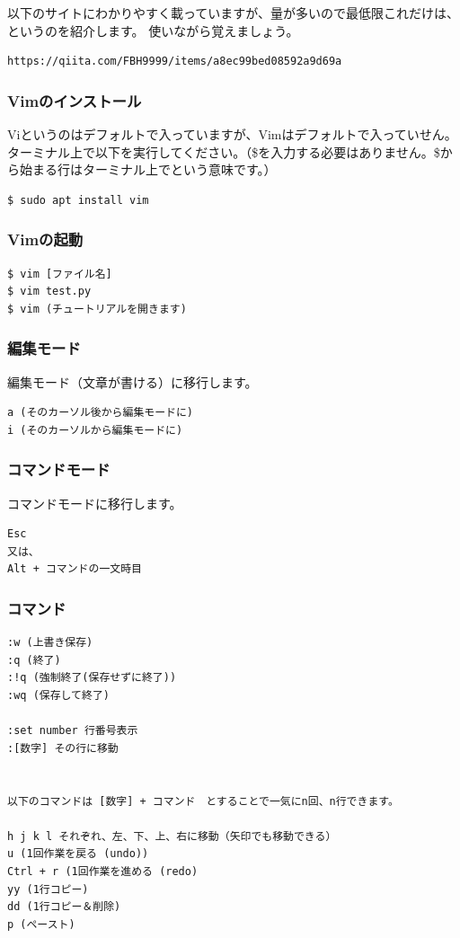 \documentclass[11pt,a4paper]{jsarticle}
\begin{document}
以下のサイトにわかりやすく載っていますが、量が多いので最低限これだけは、というのを紹介します。
使いながら覚えましょう。
\begin{lstlisting}[frame=single]
https://qiita.com/FBH9999/items/a8ec99bed08592a9d69a
\end{lstlisting}

\subsubsection{Vimのインストール}
Viというのはデフォルトで入っていますが、Vimはデフォルトで入っていせん。
ターミナル上で以下を実行してください。（\$を入力する必要はありません。\$から始まる行はターミナル上でという意味です。）
\begin{lstlisting}[frame=single]
$ sudo apt install vim
\end{lstlisting}

\subsubsection{Vimの起動}

\begin{lstlisting}[frame=single]
$ vim [ファイル名]
$ vim test.py        
$ vim (チュートリアルを開きます)
\end{lstlisting}

\subsubsection{編集モード}
編集モード（文章が書ける）に移行します。
\begin{lstlisting}[frame=single]
a (そのカーソル後から編集モードに)
i (そのカーソルから編集モードに)
\end{lstlisting}

\subsubsection{コマンドモード}
コマンドモードに移行します。
\begin{lstlisting}[frame=single]
Esc
又は、
Alt + コマンドの一文時目
\end{lstlisting}

\subsubsection{コマンド}
\begin{lstlisting}[frame=single]
:w (上書き保存)
:q (終了)
:!q (強制終了(保存せずに終了))
:wq (保存して終了)

:set number 行番号表示
:[数字] その行に移動


以下のコマンドは [数字] + コマンド　とすることで一気にn回、n行できます。

h j k l それぞれ、左、下、上、右に移動（矢印でも移動できる）
u (1回作業を戻る (undo))
Ctrl + r (1回作業を進める (redo)
yy (1行コピー)
dd (1行コピー＆削除)
p (ペースト)



\end{lstlisting}
\end{document}
